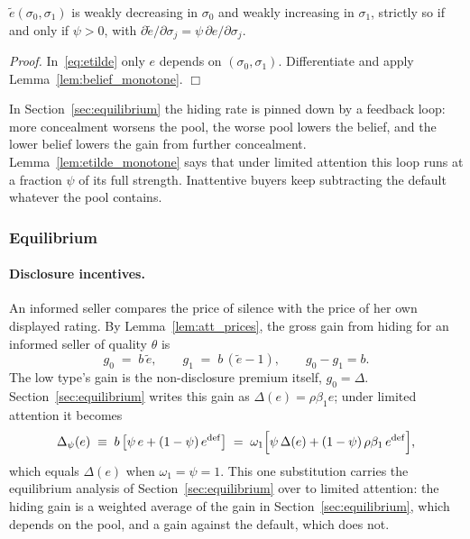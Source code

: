 \begin{lemma}
\label{lem:etilde_monotone}
$\tilde e(\sigma_0,\sigma_1)$ is weakly decreasing in $\sigma_0$ and weakly increasing in $\sigma_1$, strictly so if and only if $\psi>0$, with $\partial\tilde e/\partial\sigma_j=\psi\,\partial e/\partial\sigma_j$.
\end{lemma}

\noindent\textit{Proof.} In~\eqref{eq:etilde} only $e$ depends on $(\sigma_0,\sigma_1)$. Differentiate and apply Lemma~\ref{lem:belief_monotone}. $\Box$

In Section~\ref{sec:equilibrium} the hiding rate is pinned down by a feedback loop: more concealment worsens the pool, the worse pool lowers the belief, and the lower belief lowers the gain from further concealment. Lemma~\ref{lem:etilde_monotone} says that under limited attention this loop runs at a fraction $\psi$ of its full strength. Inattentive buyers keep subtracting the default whatever the pool contains.

\subsubsection{Equilibrium}
\label{ss:att_equilibrium}

\paragraph{Disclosure incentives.}
An informed seller compares the price of silence with the price of her own displayed rating. By Lemma~\ref{lem:att_prices}, the gross gain from hiding for an informed seller of quality $\theta$ is
\begin{equation}
    g_0\;=\;b\,\tilde e,\qquad g_1\;=\;b\,(\tilde e-1),\qquad g_0-g_1=b.
    \label{eq:gains}
\end{equation}
The low type's gain is the non-disclosure premium itself, $g_0=\Delta$. Section~\ref{sec:equilibrium} writes this gain as $\Delta(e)=\rho\beta_1e$; under limited attention it becomes
\begin{equation}
    \Delta_\psi(e)\;\equiv\;b\,\big[\psi\,e+(1-\psi)\,e^{\rm def}\big]\;=\;\omega_1\Big[\psi\,\Delta(e)+(1-\psi)\,\rho\beta_1\,e^{\rm def}\Big],
    \label{eq:Delta_psi}
\end{equation}
which equals $\Delta(e)$ when $\omega_1=\psi=1$. This one substitution carries the equilibrium analysis of Section~\ref{sec:equilibrium} over to limited attention: the hiding gain is a weighted average of the gain in Section~\ref{sec:equilibrium}, which depends on the pool, and a gain against the default, which does not.

